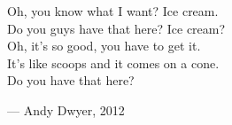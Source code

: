 \begin{flushright}
\begin{hangleftquote}{\QENOpen}{\QENClose}
Oh, you know what I want? Ice cream.\\
Do you guys have that here? Ice cream?\\
Oh, it's so good, you have to get it.\\
It's like scoops and it comes on a cone.\\
Do you have that here?
\end{hangleftquote}
\par\smallskip
\normalfont — Andy Dwyer, 2012
\end{flushright}
